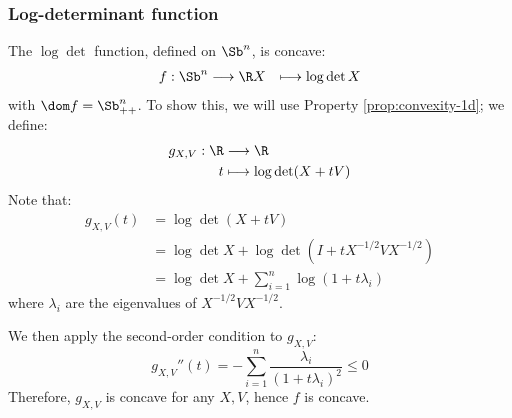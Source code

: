 \subsubsection{Log-determinant function}
The $\log\det$ function, defined on $\Sb^n$, is concave:
\begin{equation*}
    \begin{aligned}
        f: \Sb^n&\longrightarrow\R
        X &\longmapsto \log\det X
    \end{aligned}
\end{equation*}
with $\dom f = \Sb_{++}^n$. To show this, we will use Property \ref{prop:convexity-1d}; we define:
\begin{equation*}
    \begin{aligned}
        g_{X,V}: \R&\longrightarrow\R \\
        t &\longmapsto \log\det(X+tV)
    \end{aligned}
\end{equation*}
Note that:
\begin{equation*}
    \begin{aligned}
        g_{X,V}(t) 
        &= \log\det(X+tV) \\
        &= \log\det X + \log\det(I+tX^{-1/2}VX^{-1/2}) \\
        &= \log\det X + \sum_{i=1}^n \log(1+t\lambda_i)
    \end{aligned}
\end{equation*}
where $\lambda_i$ are the eigenvalues of $X^{-1/2}VX^{-1/2}$.

We then apply the second-order condition to $g_{X,V}$:
\begin{equation*}
    g_{X,V}''(t) = -\sum_{i=1}^n \frac{\lambda_i}{(1+t\lambda_i)^2} \leq 0
\end{equation*}
Therefore, $g_{X,V}$ is concave for any $X, V$, hence $f$ is concave.

